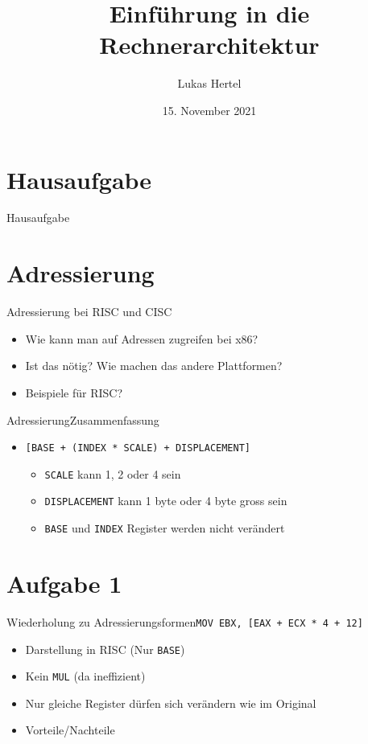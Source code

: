 \documentclass[
  german,            %
  aspectratio=169,    %
  sectionpage=false,   %
]{tumbeamer}
\title{Einführung in die Rechnerarchitektur}
\subtitle{}
\author{Lukas Hertel}
\institute{\theChairName\\\theDepartmentName\\\theUniversityName}
\date[15.11.2021]{15. November 2021}
\begin{document}
\maketitle

\section{Hausaufgabe}
\begin{frame}{Hausaufgabe}
	
\end{frame}
\section{Adressierung}
\begin{frame}{Adressierung bei RISC und CISC}
    \begin{itemize}
        \item Wie kann man auf Adressen zugreifen bei x86?
        \item Ist das nötig? Wie machen das andere Plattformen?
        \item Beispiele für RISC?
    \end{itemize}
\end{frame}
\begin{frame}{Adressierung}{Zusammenfassung}
    \begin{itemize}
        \item \texttt{[BASE + (INDEX * SCALE) + DISPLACEMENT]}
        \begin{itemize}
            \item \texttt{SCALE} kann 1, 2 oder 4 sein
            \item \texttt{DISPLACEMENT} kann 1 byte oder 4 byte gross sein
            \item \texttt{BASE} und \texttt{INDEX} Register werden nicht verändert
        \end{itemize}
    \end{itemize}
\end{frame}
\section{Aufgabe 1}
\begin{frame}{Wiederholung zu Adressierungsformen}{\texttt{MOV EBX, [EAX + ECX * 4 + 12]}}
    \begin{itemize}
        \item Darstellung in RISC (Nur \texttt{BASE})
        \item Kein \texttt{MUL} (da ineffizient)
        \item Nur gleiche Register dürfen sich verändern wie im Original
        \item Vorteile/Nachteile
    \end{itemize}
\end{frame}
\end{document}
